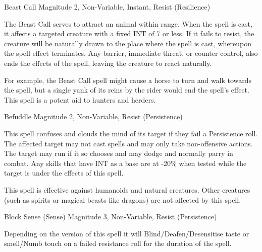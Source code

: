 %



\begin{rpg-spell}
{Beast Call}
{Magnitude 2, Non-Variable, Instant, Resist (Resilience)}

The Beast Call serves to attract an animal within range. When the spell is cast, it affects a targeted creature with a fixed INT of 7 or less. If it fails to resist, the creature will be naturally drawn to the place where the spell is cast, whereupon the spell effect terminates. Any barrier, immediate threat, or counter control, also ends the effects of the spell, leaving the creature to react naturally. 

For example, the Beast Call spell might cause a horse to turn and walk towards the spell, but a single yank of its reins by the rider would end the spell’s effect. This spell is a potent aid to hunters and herders.
\end{rpg-spell}




\begin{rpg-spell}
{Befuddle}
{Magnitude 2, Non-Variable, Resist (Persistence)}

This spell confuses and clouds the mind of its target if they fail a Persistence roll. The affected target may not cast spells and may only take non-offensive actions. The target may run if it so chooses and may dodge and normally parry in combat. Any skills that have INT as a base are at -20\% when tested while the target is under the effects of this spell.

This spell is effective against humanoids and natural creatures. Other creatures (such as spirits or magical beasts like dragons) are not affected by this spell.
\end{rpg-spell}


\begin{rpg-spell}
  {Block Sense (Sense)}
{Magnitude 3, Non-Variable, Resist (Persistence)}

Depending on the version of this spell it will Blind/Deafen/Desensitise taste or smell/Numb touch on a failed resistance roll for the duration of the spell.
\end{rpg-spell}


